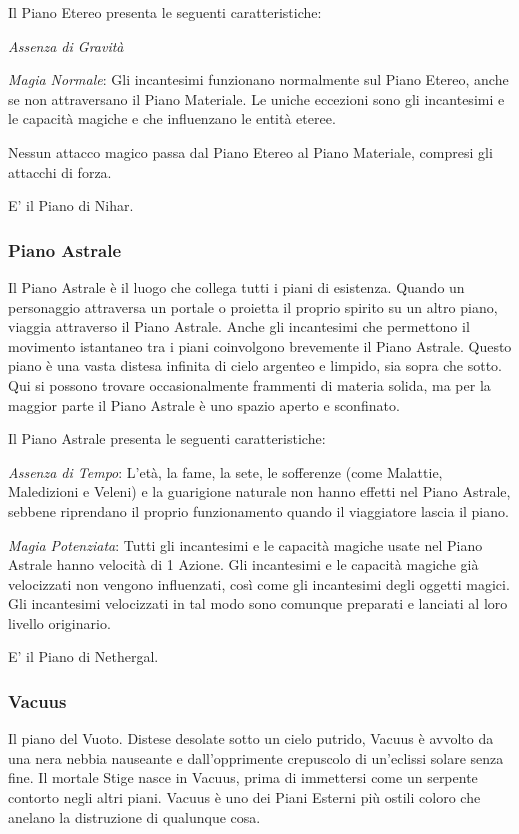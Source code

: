 \documentclass[a4paper,twoside,openany]{book}
\begin{document}
\begin{multicols}{2}
Il Piano Etereo presenta le seguenti caratteristiche:

\emph{Assenza di Gravità}

\emph{Magia Normale}: Gli incantesimi funzionano normalmente sul Piano Etereo, anche se non attraversano il Piano Materiale. Le uniche eccezioni sono gli incantesimi e le capacità magiche e che influenzano le entità eteree.

Nessun attacco magico passa dal Piano Etereo al Piano Materiale, compresi gli attacchi di forza.

E' il Piano di Nihar.

\subsubsection{Piano Astrale}\label{pianoastrale}
Il Piano Astrale è il luogo che collega tutti i piani di esistenza. Quando un personaggio attraversa un portale o proietta il proprio spirito su un altro piano, viaggia attraverso il Piano Astrale. Anche gli incantesimi che permettono il movimento istantaneo tra i piani coinvolgono brevemente il Piano Astrale. Questo piano è una vasta distesa infinita di cielo argenteo e limpido, sia sopra che sotto. Qui si possono trovare occasionalmente frammenti di materia solida, ma per la maggior parte il Piano Astrale è uno spazio aperto e sconfinato.

Il Piano Astrale presenta le seguenti caratteristiche:

\emph{Assenza di Tempo}: L'età, la fame, la sete, le sofferenze (come Malattie, Maledizioni e Veleni) e la guarigione naturale non hanno effetti nel Piano Astrale, sebbene riprendano il proprio funzionamento quando il viaggiatore lascia il piano.

\emph{Magia Potenziata}: Tutti gli incantesimi e le capacità magiche usate nel Piano Astrale hanno velocità di 1 Azione. Gli incantesimi e le capacità magiche già velocizzati non vengono influenzati, così come gli incantesimi degli oggetti magici. Gli incantesimi velocizzati in tal modo sono comunque preparati e lanciati al loro livello originario.

E' il Piano di Nethergal.

\subsubsection{Vacuus}\label{pianovuoto}
Il piano del Vuoto. Distese desolate sotto un cielo putrido, Vacuus è avvolto da una nera nebbia nauseante e dall'opprimente crepuscolo di un'eclissi solare senza fine. Il mortale Stige nasce in Vacuus, prima di immettersi come un serpente contorto negli altri piani. Vacuus è uno dei Piani Esterni più ostili coloro che anelano la distruzione di qualunque cosa.


\end{multicols}
\end{document}
